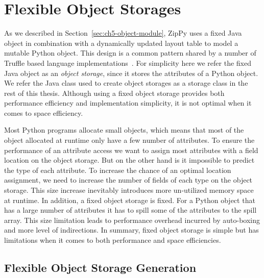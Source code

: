 \section{Flexible Object Storages}
\label{sec:ch5-flexible-object-storages}

As we described in Section~\ref{sec:ch5-object-module}, ZipPy uses a fixed Java object in combination with a dynamically updated layout table to model a mutable Python object.
This design is a common pattern shared by a number of Truffle based language implementations~\cite{seaton2014debugging,Grimmer+2014,Grimmer+2014TruffleC}.
For simplicity here we refer the fixed Java object as an \emph{object storage}, since it stores the attributes of a Python object.
We refer the Java class used to create object storages as a storage class in the rest of this thesis.
Although using a fixed object storage provides both performance efficiency and implementation simplicity, it is not optimal when it comes to space efficiency.

Most Python programs allocate small objects, which means that most of the object allocated at runtime only have a few number of attributes.
To ensure the performance of an attribute access we want to assign most attributes with a field location on the object storage.
But on the other hand is it impossible to predict the type of each attribute.
To increase the chance of an optimal location assignment, we need to increase the number of fields of each type on the object storage.
This size increase inevitably introduces more un-utilized memory space at runtime.
In addition, a fixed object storage is fixed.
For a Python object that has a large number of attributes it has to spill some of the attributes to the spill array.
This size limitation leads to performance overhead incurred by auto-boxing and more level of indirections.
In summary, fixed object storage is simple but has limitations when it comes to both performance and space efficiencies.

\subsection{Flexible Object Storage Generation}
\label{sec:ch5-flexible-object-storage-generation}

